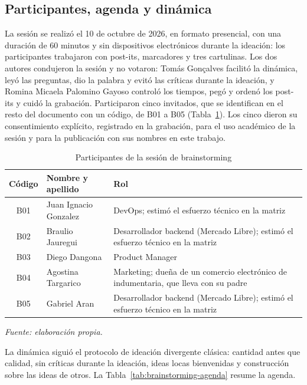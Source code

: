 \subsection{Participantes, agenda y dinámica}
\label{sec:brainstorming-participantes}

La sesión se realizó el 10 de octubre de 2026, en formato presencial, con una duración de 60 minutos y sin dispositivos electrónicos durante la ideación: los participantes trabajaron con post-its, marcadores y tres cartulinas. Los dos autores condujeron la sesión y no votaron: Tomás Gonçalves facilitó la dinámica, leyó las preguntas, dio la palabra y evitó las críticas durante la ideación, y Romina Micaela Palomino Gayoso controló los tiempos, pegó y ordenó los post-its y cuidó la grabación. Participaron cinco invitados, que se identifican en el resto del documento con un código, de B01 a B05 (Tabla~\ref{tab:brainstorming-participantes}). Los cinco dieron su consentimiento explícito, registrado en la grabación, para el uso académico de la sesión y para la publicación con sus nombres en este trabajo.

\begin{table}[ht]
\centering
\caption{Participantes de la sesión de brainstorming}
\label{tab:brainstorming-participantes}
\renewcommand{\arraystretch}{1.3}
\begin{tabular}{|c|l|p{7cm}|}
\hline
\textbf{Código} & \textbf{Nombre y apellido} & \textbf{Rol} \\
\hline
B01 & Juan Ignacio Gonzalez & DevOps; estimó el esfuerzo técnico en la matriz \\
\hline
B02 & Braulio Jauregui & Desarrollador backend (Mercado Libre); estimó el esfuerzo técnico en la matriz \\
\hline
B03 & Diego Dangona & Product Manager \\
\hline
B04 & Agostina Targarico & Marketing; dueña de un comercio electrónico de indumentaria, que lleva con su padre \\
\hline
B05 & Gabriel Aran & Desarrollador backend (Mercado Libre); estimó el esfuerzo técnico en la matriz \\
\hline
\end{tabular}

\smallskip
\noindent\textit{Fuente: elaboración propia.}
\end{table}

La dinámica siguió el protocolo de ideación divergente clásica: cantidad antes que calidad, sin críticas durante la ideación, ideas locas bienvenidas y construcción sobre las ideas de otros. La Tabla~\ref{tab:brainstorming-agenda} resume la agenda.

